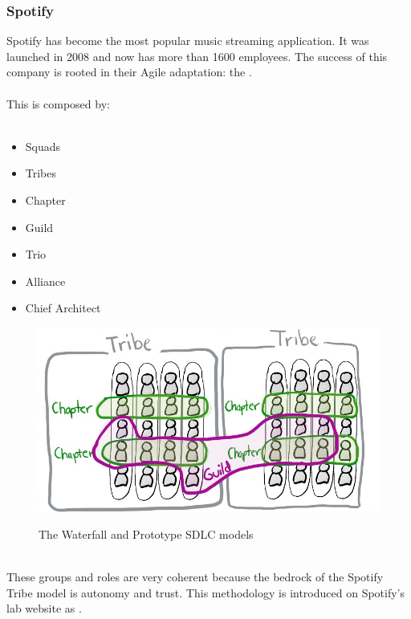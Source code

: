 	\subsubsection{Spotify}
		Spotify has become the most popular music streaming application.
		It was launched in 2008 and now has more than 1600 employees.
		The success of this company is rooted in their Agile adaptation: the .\\\\
		This is composed by:\\\\
		\begin{minipage}[c]{0.25\textwidth}
			\begin{itemize}
				\item Squads
				\item Tribes
				\item Chapter
				\item Guild
				\item Trio
				\item Alliance
				\item Chief Architect
			\end{itemize}
		\end{minipage}
		\hfill
		\begin{minipage}[c]{0.70\textwidth}
			\vspace{-2cm}
			\begin{figure}[H]
				\centering
				\includegraphics[width=\textwidth]{resources/spot}\\
				\caption{The Waterfall and Prototype SDLC models}
			\end{figure}
		\end{minipage}\\
		These groups and roles are very coherent because the bedrock of the Spotify Tribe model is autonomy and trust\cite{exploring-key-elements-of-spotifys}.
		This methodology is introduced on Spotify's lab website as \cite{spotify-engineering-culture}.
		
